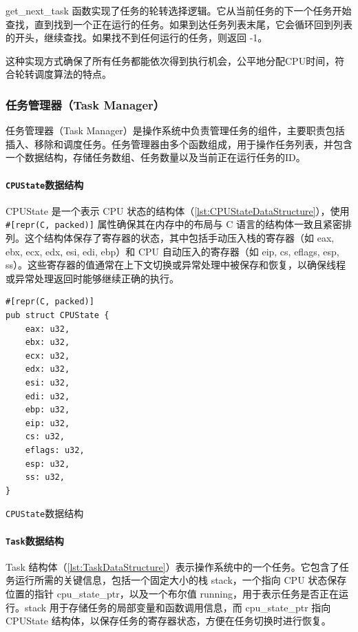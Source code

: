 get\_next\_task 函数实现了任务的轮转选择逻辑。它从当前任务的下一个任务开始查找，直到找到一个正在运行的任务。如果到达任务列表末尾，它会循环回到列表的开头，继续查找。如果找不到任何运行的任务，则返回 -1。

这种实现方式确保了所有任务都能依次得到执行机会，公平地分配CPU时间，符合轮转调度算法的特点。

\subsubsection{任务管理器（Task Manager）}

任务管理器（Task Manager）是操作系统中负责管理任务的组件，主要职责包括插入、移除和调度任务。任务管理器由多个函数组成，用于操作任务列表，并包含一个数据结构，存储任务数组、任务数量以及当前正在运行任务的ID。

\paragraph{\texttt{CPUState}数据结构}

CPUState 是一个表示 CPU 状态的结构体（\cref{lst:CPUStateDataStructure}），使用 \texttt{\#[repr(C, packed)]} 属性确保其在内存中的布局与 C 语言的结构体一致且紧密排列。这个结构体保存了寄存器的状态，其中包括手动压入栈的寄存器（如 eax, ebx, ecx, edx, esi, edi, ebp）和 CPU 自动压入的寄存器（如 eip, cs, eflags, esp, ss）。这些寄存器的值通常在上下文切换或异常处理中被保存和恢复，以确保线程或异常处理返回时能够继续正确的执行。

\begin{listing}[htbp]
    \begin{verbatim}
#[repr(C, packed)]
pub struct CPUState {
    eax: u32,
    ebx: u32,
    ecx: u32,
    edx: u32,
    esi: u32,
    edi: u32,
    ebp: u32,
    eip: u32,
    cs: u32,
    eflags: u32,
    esp: u32,
    ss: u32,
}
    \end{verbatim}
    \caption{\texttt{CPUState}数据结构}\label{lst:CPUStateDataStructure}
\end{listing}

\paragraph{\texttt{Task}数据结构}

Task 结构体（\cref{lst:TaskDataStructure}）表示操作系统中的一个任务。它包含了任务运行所需的关键信息，包括一个固定大小的栈 stack，一个指向 CPU 状态保存位置的指针 cpu\_state\_ptr，以及一个布尔值 running，用于表示任务是否正在运行。stack 用于存储任务的局部变量和函数调用信息，而 cpu\_state\_ptr 指向 CPUState 结构体，以保存任务的寄存器状态，方便在任务切换时进行恢复。


